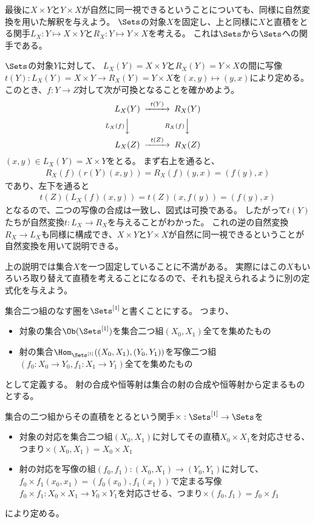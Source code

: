\documentclass{jsarticle}
\begin{document}
最後に$X \times Y$と$Y \times X$が自然に同一視できるということについても、同様に自然変換を用いた解釈を与えよう。
$\Sets$の対象$X$を固定し、上と同様に$X$と直積をとる関手$L_X:Y \mapsto X \times Y$と$R_X:Y \mapsto Y \times X$を考える。
これは$\Sets$から$\Sets$への関手である。

$\Sets$の対象$Y$に対して、
$L_X(Y)=X\times Y$と$R_X(Y)=Y \times X$の間に写像$t(Y):L_X(Y)=X \times Y \to R_X(Y)=Y \times X$を$(x,y) \mapsto (y,x)$により定める。
このとき、$f:Y\to Z$対して次が可換となることを確かめよう。
\[
\begin{CD}
L_X(Y)@>t(Y)>>R_X(Y)\\
@VL_X(f)VV@VR_X(f)VV\\
L_X(Z)@>t(Z)>>R_X(Z)
\end{CD}
\]
$(x,y) \in L_X(Y)=X\times Y$をとる。
まず右上を通ると、
\begin{align*}
R_X(f)(r(Y)(x,y))=R_X(f)(y,x)=(f(y),x)
\end{align*}
であり、左下を通ると
\begin{align*}
t(Z)(L_X(f)(x,y))=t(Z)(x,f(y))=(f(y),x)
\end{align*}
となるので、二つの写像の合成は一致し、図式は可換である。
したがって$t(Y)$たちが自然変換$t:L_X \to R_X$を与えることがわかった。
これの逆の自然変換$R_X \to L_X$も同様に構成でき、$X \times Y$と$Y \times X$が自然に同一視できるということが自然変換を用いて説明できる。

\vspace{10pt}
上の説明では集合$X$を一つ固定していることに不満がある。
実際にはこの$X$もいろいろ取り替えて直積を考えることになるので、それも捉えられるように別の定式化を与えよう。

集合二つ組のなす圏を$\Sets^{[1]}$と書くことにする。
つまり、
\begin{itemize}
\item 対象の集合$\Ob(\Sets^{[1]})$を集合二つ組$(X_0,X_1)$全てを集めたもの
\item 射の集合$\Hom_{\Sets^{[1]}}((X_0,X_1),(Y_0,Y_1))$を写像二つ組$(f_0:X_0 \to Y_0, f_1:X_1\to Y_1)$全てを集めたもの
\end{itemize}
として定義する。
射の合成や恒等射は集合の射の合成や恒等射から定まるものとする。

集合の二つ組からその直積をとるという関手$\times:\Sets^{[1]} \to \Sets$を
\begin{itemize}
\item 対象の対応を集合二つ組$(X_0,X_1)$に対してその直積$X_0 \times X_1$を対応させる、つまり$\times(X_0,X_1)=X_0\times X_1$
\item 射の対応を写像の組$(f_0,f_1):(X_0,X_1) \to (Y_0,Y_1)$に対して、$f_0\times f_1(x_0,x_1)=(f_0(x_0),f_1(x_1))$で定まる写像$f_0\times f_1:X_0 \times X_1 \to Y_0 \times Y_1$を対応させる、つまり$\times(f_0,f_1)=f_0\times f_1$
\end{itemize}
により定める。
\end{document}
